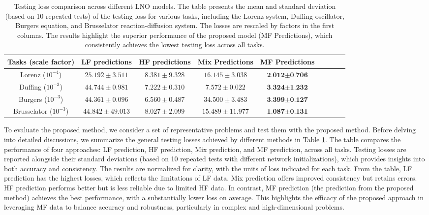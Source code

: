 \begin{table}[!htbp]\centering
\caption{Testing loss comparison across different LNO models. The table presents the mean and standard deviation (based on 10 repeated tests) of the testing loss for various tasks, including the Lorenz system, Duffing oscillator, Burgers equation, and Brusselator reaction-diffusion system. The losses are rescaled by factors in the first columns. The results highlight the superior performance of the proposed model (MF Predictions), which consistently achieves the lowest testing loss across all tasks.}\label{tab:test_loss}
\begin{tabular}{ccccccccc}
\toprule
Tasks (scale factor)        & LF predictions & HF predictions       & Mix Predictions & \textbf{MF Predictions} \\ \midrule
Lorenz ($10^{-4}$) & $25.192\scriptstyle \pm 3.511$ & $8.381\scriptstyle \pm 9.328$ & $16.145\scriptstyle \pm 3.038$ & $\textbf{2.012}\scriptstyle \pm \textbf{0.706}$     &      \\
Duffing ($10^{-3}$) & $44.744\scriptstyle \pm 0.981$ & $7.222\scriptstyle \pm 0.310$ & $7.572\scriptstyle \pm 0.022$ & $\textbf{3.324}\scriptstyle \pm \textbf{1.232}$     &      \\
Burgers ($10^{-3}$) & $44.361\scriptstyle \pm 0.096$ & $6.560\scriptstyle \pm 0.487$ & $34.500\scriptstyle \pm 3.483$ & $\textbf{3.399}\scriptstyle \pm \textbf{0.127}$     &      \\ 
Brusselator ($10^{-3}$) & $44.842\scriptstyle \pm 49.013$ & $8.027\scriptstyle \pm 2.099$ & $15.489\scriptstyle \pm 11.977$ & $\textbf{1.087}\scriptstyle \pm \textbf{0.131}$     &      \\ \bottomrule
\end{tabular}
\end{table}

To evaluate the proposed method, we consider a set of representative problems and test them with the proposed method. Before delving into detailed discussions, we summarize the general testing losses achieved by different methods in Table \ref{tab:test_loss}. The table compares the performance of four approaches: LF prediction, HF prediction, Mix prediction, and MF prediction, across all tasks. Testing losses are reported alongside their standard deviations (based on 10 repeated tests with different network initializations), which provides insights into both accuracy and consistency. The results are normalized for clarity, with the units of loss indicated for each task. From the table, LF prediction has the highest losses, which reflects the limitations of LF data. Mix prediction offers improved consistency but retains errors. HF prediction performs better but is less reliable due to limited HF data. In contrast, MF prediction (the prediction from the proposed method) achieves the best performance, with a substantially lower loss on average. This highlights the efficacy of the proposed approach in leveraging MF data to balance accuracy and robustness, particularly in complex and high-dimensional problems.

